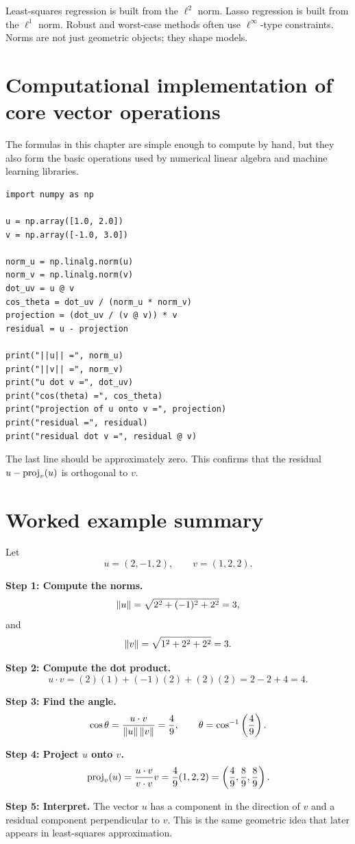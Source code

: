 \begin{bridgebox}[title={Why this matters later}]
Least-squares regression is built from the $\ell^2$ norm. Lasso regression is built from the $\ell^1$ norm. Robust and worst-case methods often use $\ell^\infty$-type constraints. Norms are not just geometric objects; they shape models.
\end{bridgebox}

\section{Computational implementation of core vector operations}

The formulas in this chapter are simple enough to compute by hand, but they also form the basic operations used by numerical linear algebra and machine learning libraries.

\begin{lstlisting}[style=pythonstyle]
import numpy as np

u = np.array([1.0, 2.0])
v = np.array([-1.0, 3.0])

norm_u = np.linalg.norm(u)
norm_v = np.linalg.norm(v)
dot_uv = u @ v
cos_theta = dot_uv / (norm_u * norm_v)
projection = (dot_uv / (v @ v)) * v
residual = u - projection

print("||u|| =", norm_u)
print("||v|| =", norm_v)
print("u dot v =", dot_uv)
print("cos(theta) =", cos_theta)
print("projection of u onto v =", projection)
print("residual =", residual)
print("residual dot v =", residual @ v)
\end{lstlisting}

The last line should be approximately zero. This confirms that the residual $u-\operatorname{proj}_v(u)$ is orthogonal to $v$.

\section{Worked example summary}

\begin{examplebox}[title={Example 3.10: Full vector analysis}]
Let
\[
  u=(2,-1,2), \qquad v=(1,2,2).
\]

\textbf{Step 1: Compute the norms.}
\[
  \left\lVert u\right\rVert=\sqrt{2^2+(-1)^2+2^2}=3,
\]
and
\[
  \left\lVert v\right\rVert=\sqrt{1^2+2^2+2^2}=3.
\]

\textbf{Step 2: Compute the dot product.}
\[
  u\cdot v=(2)(1)+(-1)(2)+(2)(2)=2-2+4=4.
\]

\textbf{Step 3: Find the angle.}
\[
  \cos\theta=\frac{u\cdot v}{\left\lVert u\right\rVert\left\lVert v\right\rVert}=\frac{4}{9},
  \qquad
  \theta=\cos^{-1}\left(\frac49\right).
\]

\textbf{Step 4: Project $u$ onto $v$.}
\[
  \operatorname{proj}_v(u)=\frac{u\cdot v}{v\cdot v}v
  =\frac49(1,2,2)
  =\left(\frac49,\frac89,\frac89\right).
\]

\textbf{Step 5: Interpret.}
The vector $u$ has a component in the direction of $v$ and a residual component perpendicular to $v$. This is the same geometric idea that later appears in least-squares approximation.
\end{examplebox}


